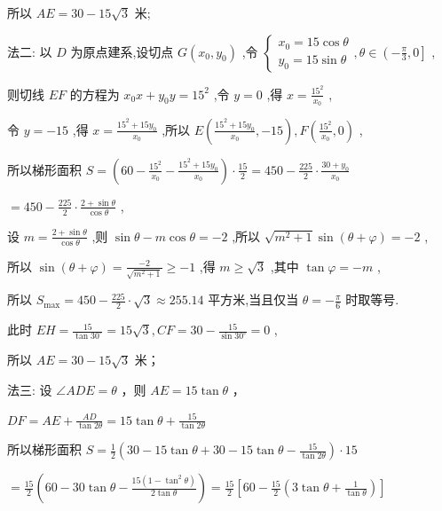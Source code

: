 \documentclass[10pt]{article}
\begin{document}
所以 \({AE} = {30} - {15}\sqrt{3}\) 米;

法二: 以 \(D\) 为原点建系,设切点 \(G\left( {{x}_{0},{y}_{0}}\right)\) ,令 \(\left\{  {\begin{array}{l} {x}_{0} = {15}\cos \theta \\  {y}_{0} = {15}\sin \theta  \end{array},\theta  \in  \left( {-\frac{\pi }{3},0}\right\rbrack  }\right.\) ,

则切线 \({EF}\) 的方程为 \({x}_{0}x + {y}_{0}y = {15}^{2}\) ,令 \(y = 0\) ,得 \(x = \frac{{15}^{2}}{{x}_{0}}\) ,

令 \(y =  - {15}\) ,得 \(x = \frac{{15}^{2} + {15}{y}_{0}}{{x}_{0}}\) ,所以 \(E\left( {\frac{{15}^{2} + {15}{y}_{0}}{{x}_{0}}, - {15}}\right) ,F\left( {\frac{{15}^{2}}{{x}_{0}},0}\right)\) ,

所以梯形面积 \(S = \left( {{60} - \frac{{15}^{2}}{{x}_{0}} - \frac{{15}^{2} + {15}{y}_{0}}{{x}_{0}}}\right)  \cdot  \frac{15}{2} = {450} - \frac{225}{2} \cdot  \frac{{30} + {y}_{0}}{{x}_{0}}\)

\(= {450} - \frac{225}{2} \cdot  \frac{2 + \sin \theta }{\cos \theta }\) ,

设 \(m = \frac{2 + \sin \theta }{\cos \theta }\) ,则 \(\sin \theta  - m\cos \theta  =  - 2\) ,所以 \(\sqrt{{m}^{2} + 1}\sin \left( {\theta  + \varphi }\right)  =  - 2\) ,

所以 \(\sin \left( {\theta  + \varphi }\right)  = \frac{-2}{\sqrt{{m}^{2} + 1}} \geq   - 1\) ,得 \(m \geq  \sqrt{3}\) ,其中 \(\tan \varphi  =  - m\) ,

所以 \({S}_{\max } = {450} - \frac{225}{2} \cdot  \sqrt{3} \approx  {255.14}\) 平方米,当且仅当 \(\theta  =  - \frac{\pi }{6}\) 时取等号.

此时 \({EH} = \frac{15}{\tan {30}^{ \circ  }} = {15}\sqrt{3},{CF} = {30} - \frac{15}{\sin {30}^{ \circ  }} = 0\) ,

所以 \({AE} = {{30} - {15}\sqrt{3}}\) 米；

法三: 设 \(\angle {ADE} = \theta\) ，则 \({AE} = {15}\tan \theta\) ，

\({DF} = {AE} + \frac{AD}{\tan {2\theta }} = {15}\tan \theta  + \frac{15}{\tan {2\theta }}\)

所以梯形面积 \(S = \frac{1}{2}\left( {{30} - {15}\tan \theta  + {30} - {15}\tan \theta  - \frac{15}{\tan {2\theta }}}\right)  \cdot  {15}\)

\(= \frac{15}{2}\left( {{60} - {30}\tan \theta  - \frac{{15}\left( {1 - {\tan }^{2}\theta }\right) }{2\tan \theta }}\right)  = \frac{15}{2}\left\lbrack  {{60} - \frac{15}{2}\left( {3\tan \theta  + \frac{1}{\tan \theta }}\right) }\right\rbrack\)
\end{document}
